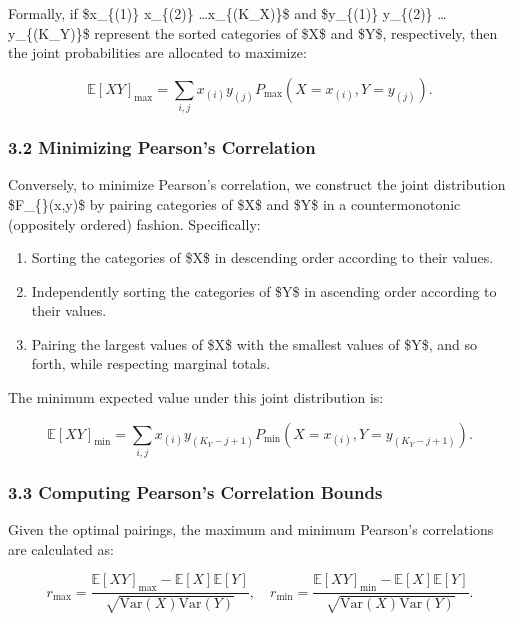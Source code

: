 \documentclass[
  12pt,
]{article}
\providecommand{\tightlist}{%
  \setlength{\itemsep}{0pt}\setlength{\parskip}{0pt}}\usepackage{longtable,booktabs,array}
\begin{document}
Formally, if \$x\_\{(1)\} \geq x\_\{(2)\}
\geq \dots \geq x\_\{(K\_X)\}\$ and \$y\_\{(1)\} \geq y\_\{(2)\}
\geq \dots \geq y\_\{(K\_Y)\}\$ represent the sorted categories of \$X\$
and \$Y\$, respectively, then the joint probabilities are allocated to
maximize:

\[
\mathbb{E}[XY]_{\text{max}} = \sum_{i,j} x_{(i)} y_{(j)} P_{\text{max}}(X = x_{(i)}, Y = y_{(j)}).
\]

\subsubsection{3.2 Minimizing Pearson's
Correlation}\label{minimizing-pearsons-correlation-1}

Conversely, to minimize Pearson's correlation, we construct the joint
distribution \$F\_\{\}(x,y)\$ by pairing categories of \$X\$
and \$Y\$ in a countermonotonic (oppositely ordered) fashion.
Specifically:

\begin{enumerate}
\def\labelenumi{\arabic{enumi}.}
\tightlist
\item
  Sorting the categories of \$X\$ in descending order according to their
  values.
\item
  Independently sorting the categories of \$Y\$ in ascending order
  according to their values.
\item
  Pairing the largest values of \$X\$ with the smallest values of \$Y\$,
  and so forth, while respecting marginal totals.
\end{enumerate}

The minimum expected value under this joint distribution is:

\[
\mathbb{E}[XY]_{\text{min}} = \sum_{i,j} x_{(i)} y_{(K_Y - j + 1)} P_{\text{min}}(X = x_{(i)}, Y = y_{(K_Y - j + 1)}).
\]

\subsubsection{3.3 Computing Pearson's Correlation
Bounds}\label{computing-pearsons-correlation-bounds}

Given the optimal pairings, the maximum and minimum Pearson's
correlations are calculated as:

\[
r_{\text{max}} = \frac{\mathbb{E}[XY]_{\text{max}} - \mathbb{E}[X]\mathbb{E}[Y]}{\sqrt{\text{Var}(X)\text{Var}(Y)}}, \quad r_{\text{min}} = \frac{\mathbb{E}[XY]_{\text{min}} - \mathbb{E}[X]\mathbb{E}[Y]}{\sqrt{\text{Var}(X)\text{Var}(Y)}}.
\]
\end{document}
